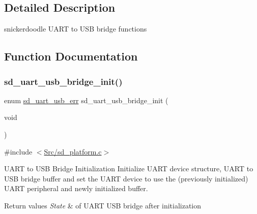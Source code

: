 \subsection{Detailed Description}
snickerdoodle U\+A\+RT to U\+SB bridge functions 



\subsection{Function Documentation}
\mbox{\label{group___s_d___u_a_r_t___u_s_b___bridge_gaa03f4625c66a0fe3be62a6aead8ac2ba}} 
\subsubsection{\texorpdfstring{sd\+\_\+uart\+\_\+usb\+\_\+bridge\+\_\+init()}{sd\_uart\_usb\_bridge\_init()}}
{\footnotesize\ttfamily enum \mbox{\hyperlink{group___s_d___u_a_r_t___u_s_b___bridge___types_ga7e4773a8cce69fafe541cad55985f146}{sd\+\_\+uart\+\_\+usb\+\_\+err}} sd\+\_\+uart\+\_\+usb\+\_\+bridge\+\_\+init (\begin{DoxyParamCaption}\item[{void}]{ }\end{DoxyParamCaption})}



{\ttfamily \#include $<$\mbox{\hyperlink{sd__platform_8c}{Src/sd\+\_\+platform.\+c}}$>$}



U\+A\+RT to U\+SB Bridge Initialization Initialize U\+A\+RT device structure, U\+A\+RT to U\+SB bridge buffer and set the U\+A\+RT device to use the (previously initialized) U\+A\+RT peripheral and newly initialized buffer. 


\begin{DoxyRetVals}{Return values}
{\em State} & of U\+A\+RT U\+SB bridge after initialization \\
\hline
\end{DoxyRetVals}


